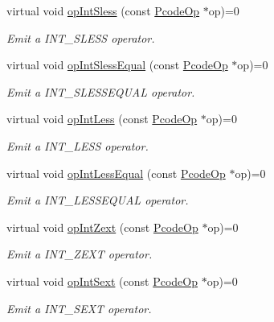 \begin{DoxyCompactItemize}
virtual void \mbox{\hyperlink{class_print_language_a1c7cb915cd2bd60997c8224e5ec37e63}{op\+Int\+Sless}} (const \mbox{\hyperlink{class_pcode_op}{Pcode\+Op}} $\ast$op)=0
\begin{DoxyCompactList}\small\item\em Emit a I\+N\+T\+\_\+\+S\+L\+E\+SS operator. \end{DoxyCompactList}\item 
virtual void \mbox{\hyperlink{class_print_language_a5fe4cbf51689ac47f02e620cb1c6836f}{op\+Int\+Sless\+Equal}} (const \mbox{\hyperlink{class_pcode_op}{Pcode\+Op}} $\ast$op)=0
\begin{DoxyCompactList}\small\item\em Emit a I\+N\+T\+\_\+\+S\+L\+E\+S\+S\+E\+Q\+U\+AL operator. \end{DoxyCompactList}\item 
virtual void \mbox{\hyperlink{class_print_language_ab11ed4ec37d646195cff04addc0f4c6a}{op\+Int\+Less}} (const \mbox{\hyperlink{class_pcode_op}{Pcode\+Op}} $\ast$op)=0
\begin{DoxyCompactList}\small\item\em Emit a I\+N\+T\+\_\+\+L\+E\+SS operator. \end{DoxyCompactList}\item 
virtual void \mbox{\hyperlink{class_print_language_ae2e7c8d4088eb6d611f447b6e693a7c6}{op\+Int\+Less\+Equal}} (const \mbox{\hyperlink{class_pcode_op}{Pcode\+Op}} $\ast$op)=0
\begin{DoxyCompactList}\small\item\em Emit a I\+N\+T\+\_\+\+L\+E\+S\+S\+E\+Q\+U\+AL operator. \end{DoxyCompactList}\item 
virtual void \mbox{\hyperlink{class_print_language_a0965bc1dc10ee48a035458d25fc7066c}{op\+Int\+Zext}} (const \mbox{\hyperlink{class_pcode_op}{Pcode\+Op}} $\ast$op)=0
\begin{DoxyCompactList}\small\item\em Emit a I\+N\+T\+\_\+\+Z\+E\+XT operator. \end{DoxyCompactList}\item 
virtual void \mbox{\hyperlink{class_print_language_a461fdd5646855eed80d37ed8dceca4f0}{op\+Int\+Sext}} (const \mbox{\hyperlink{class_pcode_op}{Pcode\+Op}} $\ast$op)=0
\begin{DoxyCompactList}\small\item\em Emit a I\+N\+T\+\_\+\+S\+E\+XT operator. \end{DoxyCompactList}\item 

\end{DoxyCompactItemize}
